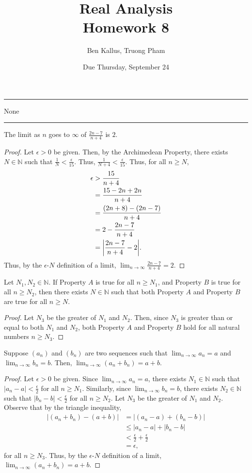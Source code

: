 \documentclass[12pt]{article}
\title{Real Analysis \\ Homework 8}
\author{Ben Kallus, Truong Pham}
\date{Due Thursday, September 24}
\begin{document}
\maketitle

\hrule
\bigskip

 None

\bigskip
\hrule
\bigskip

 The limit as $n$ goes to $\infty$ of $\frac{2n-7}{n+4}$ is $2$.
\begin{proof}
    Let $\epsilon > 0$ be given. Then, by the Archimedean Property, there exists $N \in \mathbb N$ such that $\frac{1}{N} < \frac\epsilon{15}$. Thus, $\frac{1}{N+4} < \frac\epsilon{15}$. Thus, for all $n \geq N$,
    \begin{align*}
        \epsilon &> \frac{15}{n+4} \\
                 &= \frac{15 - 2n  + 2n}{n+4} \\
                 &= \frac{(2n + 8) - (2n - 7)}{n+4} \\
                 &= 2 - \frac{2n - 7}{n+4} \\
                 &= \bigg{|} \frac{2n - 7}{n+4} - 2 \bigg{|}.
    \end{align*}
    Thus, by the $\epsilon$-$N$ definition of a limit, $\lim_{n \to \infty} \frac{2n-7}{n+4} = 2$.
\end{proof}

\newpage
{} Let $N_1, N_2 \in \mathbb N$. If Property $A$ is true for all $n \geq N_1$, and Property $B$ is true for all $n \geq N_2$, then there exists $N \in \mathbb N$ such that both Property $A$ and Property $B$ are true for all $n \geq N$.
\begin{proof}
    Let $N_3$ be the greater of $N_1$ and $N_2$. Then, since $N_3$ is greater than or equal to both $N_1$ and $N_2$, both Property $A$ and Property $B$ hold for all natural numbers $n \geq N_3$.
\end{proof}

\newpage
{} Suppose $(a_n)$ and $(b_n)$ are two sequences such that $\lim_{n\to\infty}a_n=a$ and $\lim_{n\to\infty}b_n=b$. Then, $\lim_{n\to\infty}(a_n+b_n)=a+b$.
\begin{proof}
    Let $\epsilon > 0$ be given. Since $\lim_{n\to\infty}a_n=a$, there exists $N_1 \in \mathbb N$ such that $|a_n - a| < \frac\epsilon2$ for all $n \geq N_1$. Similarly, since $\lim_{n\to\infty}b_n=b$, there exists $N_2 \in \mathbb N$ such that $|b_n - b| < \frac\epsilon2$ for all $n \geq N_2$. Let $N_3$ be the greater of $N_1$ and $N_2$. Observe that by the triangle inequality,
    \begin{align*}
        |(a_n+b_n) - (a+b)| &= |(a_n-a) + (b_n-b)| \\
                            &\leq |a_n-a| + |b_n-b| \\
                            &< \frac\epsilon2 + \frac\epsilon2 \\
                            &= \epsilon,
    \end{align*}
    for all $n \geq N_3$. Thus, by the $\epsilon$-$N$ definition of a limit, $\lim_{n\to\infty}(a_n+b_n)=a+b$.
\end{proof}
\end{document}
